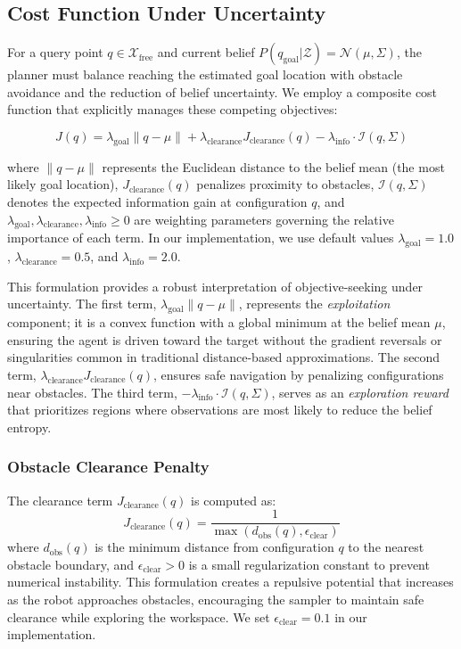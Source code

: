 \subsection{Cost Function Under Uncertainty}

For a query point $q \in \mathcal{X}_{\text{free}}$ and current belief $P(q_{\text{goal}} | \mathcal{Z}) = \mathcal{N}(\mu, \Sigma)$, the planner must balance reaching the estimated goal location with obstacle avoidance and the reduction of belief uncertainty. We employ a composite cost function that explicitly manages these competing objectives:

\begin{equation}
    J(q) = \lambda_{\text{goal}} \|q - \mu\| + \lambda_{\text{clearance}} J_{\text{clearance}}(q) - \lambda_{\text{info}} \cdot \mathcal{I}(q, \Sigma)
\end{equation}

where $\|q - \mu\|$ represents the Euclidean distance to the belief mean (the most likely goal location), $J_{\text{clearance}}(q)$ penalizes proximity to obstacles, $\mathcal{I}(q, \Sigma)$ denotes the expected information gain at configuration $q$, and $\lambda_{\text{goal}}, \lambda_{\text{clearance}}, \lambda_{\text{info}} \geq 0$ are weighting parameters governing the relative importance of each term. In our implementation, we use default values $\lambda_{\text{goal}} = 1.0$, $\lambda_{\text{clearance}} = 0.5$, and $\lambda_{\text{info}} = 2.0$.

This formulation provides a robust interpretation of objective-seeking under uncertainty. The first term, $\lambda_{\text{goal}} \|q - \mu\|$, represents the \emph{exploitation} component; it is a convex function with a global minimum at the belief mean $\mu$, ensuring the agent is driven toward the target without the gradient reversals or singularities common in traditional distance-based approximations. The second term, $\lambda_{\text{clearance}} J_{\text{clearance}}(q)$, ensures safe navigation by penalizing configurations near obstacles. The third term, $-\lambda_{\text{info}} \cdot \mathcal{I}(q, \Sigma)$, serves as an \emph{exploration reward} that prioritizes regions where observations are most likely to reduce the belief entropy.

\subsubsection{Obstacle Clearance Penalty}

The clearance term $J_{\text{clearance}}(q)$ is computed as:
\begin{equation}
    J_{\text{clearance}}(q) = \frac{1}{\max(d_{\text{obs}}(q), \epsilon_{\text{clear}})}
\end{equation}
where $d_{\text{obs}}(q)$ is the minimum distance from configuration $q$ to the nearest obstacle boundary, and $\epsilon_{\text{clear}} > 0$ is a small regularization constant to prevent numerical instability. This formulation creates a repulsive potential that increases as the robot approaches obstacles, encouraging the sampler to maintain safe clearance while exploring the workspace. We set $\epsilon_{\text{clear}} = 0.1$ in our implementation.

